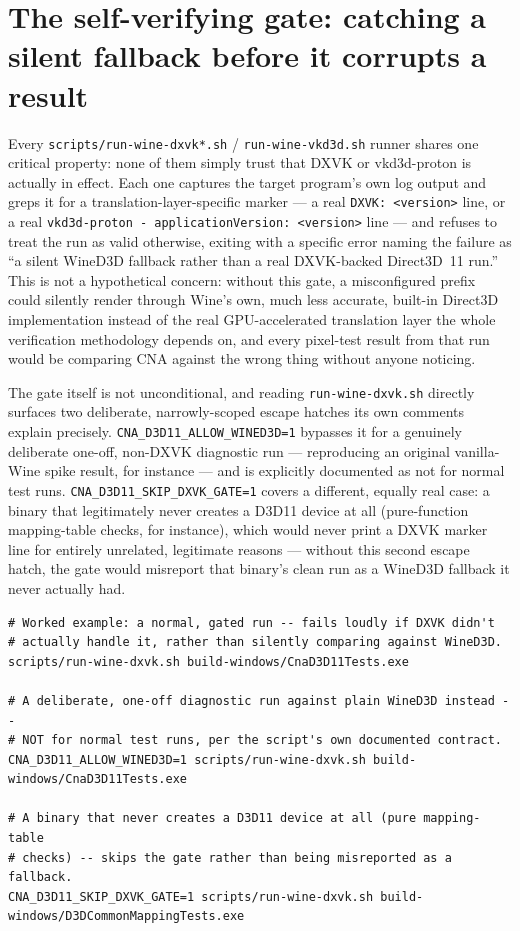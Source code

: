 \section{The self-verifying gate: catching a silent fallback before it corrupts a result}

Every \texttt{scripts/run-wine-dxvk*.sh} / \texttt{run-wine-vkd3d.sh} runner shares one
critical property: none of them simply trust that DXVK or vkd3d-proton is actually in effect.
Each one captures the target program's own log output and greps it for a translation-layer-specific
marker --- a real \texttt{DXVK: <version>} line, or a real \texttt{vkd3d-proton -
applicationVersion: <version>} line --- and refuses to treat the run as valid otherwise,
exiting with a specific error naming the failure as ``a silent WineD3D fallback rather than a
real DXVK-backed Direct3D~11 run.'' This is not a hypothetical concern: without this gate, a
misconfigured prefix could silently render through Wine's own, much less accurate, built-in
Direct3D implementation instead of the real GPU-accelerated translation layer the whole
verification methodology depends on, and every pixel-test result from that run would be
comparing CNA against the wrong thing without anyone noticing.

The gate itself is not unconditional, and reading \texttt{run-wine-dxvk.sh} directly surfaces
two deliberate, narrowly-scoped escape hatches its own comments explain precisely.
\texttt{CNA\_D3D11\_ALLOW\_WINED3D=1} bypasses it for a genuinely deliberate one-off,
non-DXVK diagnostic run --- reproducing an original vanilla-Wine spike result, for instance ---
and is explicitly documented as not for normal test runs.
\texttt{CNA\_D3D11\_SKIP\_DXVK\_GATE=1} covers a different, equally real case: a binary that
legitimately never creates a D3D11 device at all (pure-function mapping-table checks, for
instance), which would never print a DXVK marker line for entirely unrelated, legitimate
reasons --- without this second escape hatch, the gate would misreport that binary's clean run
as a WineD3D fallback it never actually had.

\begin{lstlisting}[style=cnashell]
# Worked example: a normal, gated run -- fails loudly if DXVK didn't
# actually handle it, rather than silently comparing against WineD3D.
scripts/run-wine-dxvk.sh build-windows/CnaD3D11Tests.exe

# A deliberate, one-off diagnostic run against plain WineD3D instead --
# NOT for normal test runs, per the script's own documented contract.
CNA_D3D11_ALLOW_WINED3D=1 scripts/run-wine-dxvk.sh build-windows/CnaD3D11Tests.exe

# A binary that never creates a D3D11 device at all (pure mapping-table
# checks) -- skips the gate rather than being misreported as a fallback.
CNA_D3D11_SKIP_DXVK_GATE=1 scripts/run-wine-dxvk.sh build-windows/D3DCommonMappingTests.exe
\end{lstlisting}

